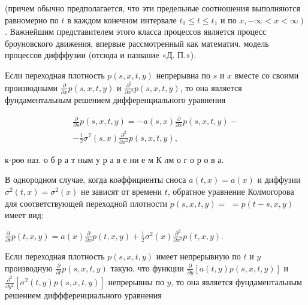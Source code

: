 \documentclass[10pt]{article}
\begin{document}
(причем обычно предполагается, что эти предельные соотношения выполняются равномерно по $t$ в каждом конечном интервале $t_{0} \leqslant t \leqslant t_{1}$ и по $\left.x,-\infty<x<\infty\right)$. Важнейшим представителем этого класса процессов является процесс броуновского движения, впервые рассмотренный как математич. модель процессов дифффузии (отсюда и название «Д. П.»).



Если переходная плотность $p(s, x, t, y)$ непрерывна по $s$ и $x$ вместе со своими производными $\frac{\partial}{\partial x} p(s, x, t, y)$ и $\frac{\partial^{2}}{\partial x^{2}} p(s, x, t, y)$, то она является фундаментальным решением дифференциального уравнения



\[

\begin{gathered}

\frac{\partial}{\partial s} p(s, x, t, y)=-a(s, x) \frac{\partial}{\partial x} p(s, x, t, y)- \\

-\frac{1}{2} \sigma^{2}(s, x) \frac{\partial^{2}}{\partial x^{2}} p(s, x, t, y),

\end{gathered}

\]



к-роө наз. о б р а т ным у р а в е ни е м К лм о г о р о в а.



В однородном случае, когда коәффициенты сноса $a(t, x)=a(x)$ и диффузии $\sigma^{2}(t, x)=\sigma^{2}(x)$ не зависят от времени $t$, обратное уравнение Колмогорова для соответствующей переходной плотности $p(s, x, t, y)=$ $=p(t-s, x, y)$ имеет вид:



$\frac{\partial}{\partial t} p(t, x, y)=a(x) \frac{\partial}{\partial x} p(t, x, y)+\frac{1}{2} \sigma^{2}(x) \frac{\partial^{2}}{\partial x^{2}} p(t, x, y)$.



Если переходная плотность $p(s, x, t, y)$ имеет непрерывную по $t$ и $y$ производную $\frac{\partial}{\partial t} p(s, x, t, y)$ такую, что функции $\frac{\partial}{\partial y}[a(t, y) p(s, x, t, y)]$ и $\frac{\partial^{2}}{\partial y^{2}}\left[\sigma^{2}(t, y) p(s, x, t, y)\right]$ непрерывны по $y$, то она является фундаментальным решением диффференциального уравнения
\end{document}

